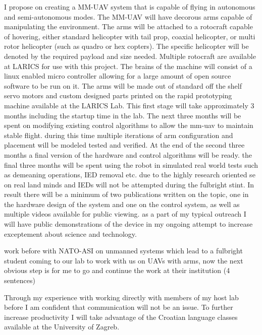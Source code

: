 \documentclass[12pt]{article}
\begin{document}
I propose on creating a MM-UAV system that is capable of flying in autonomous and semi-autonomous 
modes.  The MM-UAV will have decorous arms capable of manipulating the environment.  The arms 
will be attached to a rotocraft capable of hovering, either standard helicopter with tail prop, coaxial 
helicopter, or multi rotor helicopter (such as quadro or hex copters).  The specific helicopter will be 
denoted by the required payload and size needed.  Multiple rotocraft are available at LARICS for use 
with this project.  The brains of the machine will consist of a linux enabled micro controller allowing for 
a large amount of open source software to be run on it.  The arms will be made out of standard off the 
shelf servo motors and custom designed parts printed on the rapid prototyping machine available at 
the LARICS Lab.  This first stage will take approximately 3 months including the startup time in the lab.  
The next three months will be spent on modifying existing control algorithms to allow the mm-uav to 
maintain stable flight.  during this time multiple iterations of arm configuration and placement will be 
modeled tested and verified.  At the end of the second three months a final version of the hardware and 
control algorithms will be ready.  the final three months will be spent using the robot in simulated real 
world tests such as demeaning operations, IED removal etc.  due to the highly research oriented se on 
real land minds and IEDs will not be attempted during the fulbright stint.  In result there will be a 
minimum of two publications written on the topic, one in the hardware design of the system and one on 
the control system, as well as multiple videos available for public viewing.  as a part of my typical 
outreach I will have public demonstrations of the device in my ongoing attempt to increase 
exceptement about science and technology.  

work before with NATO-ASI on unmanned systems which lead to a fulbright student coming to our lab 
to work with us on UAVs with arms, now the next obvious step is for me to go and continue the work at 
their institution (4 sentences)

Through my experience with working directly with members of my host lab before I am confident that communication will not be an issue.  To further increase productivity I will take advantage of the Croatian language classes available at the University of Zagreb.
\end{document}
